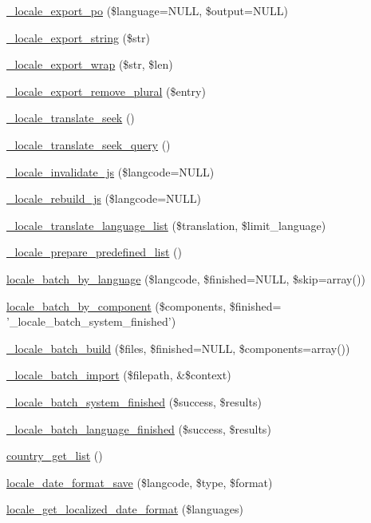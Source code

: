 \begin{DoxyCompactItemize}
\hyperlink{group__locale_gac152719d6aeadee6074247100424e145}{\_\-locale\_\-export\_\-po} (\$language=NULL, \$output=NULL)
\item 
\hyperlink{group__locale_ga8203c2c5a4f964da2395889920934fae}{\_\-locale\_\-export\_\-string} (\$str)
\item 
\hyperlink{group__locale_gaae41274b64222185a36a42dbc0ff4b94}{\_\-locale\_\-export\_\-wrap} (\$str, \$len)
\item 
\hyperlink{group__locale_gaa18a14faeb8268aee1530afb6b03cca1}{\_\-locale\_\-export\_\-remove\_\-plural} (\$entry)
\item 
\hyperlink{group__locale_ga006049082d29be75fd8ad396beda5883}{\_\-locale\_\-translate\_\-seek} ()
\item 
\hyperlink{group__locale_ga3afc18d03a7b2355e9328bc211acc4d1}{\_\-locale\_\-translate\_\-seek\_\-query} ()
\item 
\hyperlink{group__locale_gae1eec455fe9fcd01af98bb37ff4096ae}{\_\-locale\_\-invalidate\_\-js} (\$langcode=NULL)
\item 
\hyperlink{group__locale_ga1235873f9a64b606895cd77628bffabc}{\_\-locale\_\-rebuild\_\-js} (\$langcode=NULL)
\item 
\hyperlink{group__locale_gacf9e97475d1e1ffaaf336e3a943163a2}{\_\-locale\_\-translate\_\-language\_\-list} (\$translation, \$limit\_\-language)
\item 
\hyperlink{group__locale_gadf3279a1c940efe6955edc1899a97aad}{\_\-locale\_\-prepare\_\-predefined\_\-list} ()
\item 
\hyperlink{group__locale_ga2c34cb914394a45fb4e94561bfc26b71}{locale\_\-batch\_\-by\_\-language} (\$langcode, \$finished=NULL, \$skip=array())
\item 
\hyperlink{group__locale_gaa6ec98b4c2d6b82b6f206bafcf7d2ce6}{locale\_\-batch\_\-by\_\-component} (\$components, \$finished= '\_\-locale\_\-batch\_\-system\_\-finished')
\item 
\hyperlink{group__locale_ga4f10893e8ed214fe4739b9415a06948a}{\_\-locale\_\-batch\_\-build} (\$files, \$finished=NULL, \$components=array())
\item 
\hyperlink{group__locale_ga97c8b79262e3aa8af4e5ea3b7908b99b}{\_\-locale\_\-batch\_\-import} (\$filepath, \&\$context)
\item 
\hyperlink{group__locale_ga3b7cc14a5735d2aee066dd4f6bb517b8}{\_\-locale\_\-batch\_\-system\_\-finished} (\$success, \$results)
\item 
\hyperlink{group__locale_ga06bd6310727083246869907515bea547}{\_\-locale\_\-batch\_\-language\_\-finished} (\$success, \$results)
\item 
\hyperlink{locale_8inc_a53c04ad515e4f3eace3532fcdbedb834}{country\_\-get\_\-list} ()
\item 
\hyperlink{locale_8inc_ac9cf4c832fb3fda77e42b0553e0289de}{locale\_\-date\_\-format\_\-save} (\$langcode, \$type, \$format)
\item 
\hyperlink{locale_8inc_a1e11debad1c66255e8a096ef09dde589}{locale\_\-get\_\-localized\_\-date\_\-format} (\$languages)
\end{DoxyCompactItemize}


